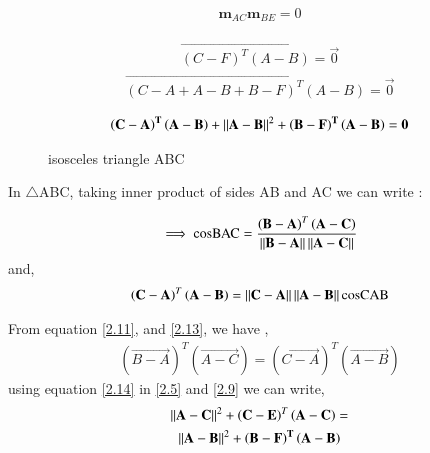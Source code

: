 \documentclass[journal,12pt,twocolumn]{IEEEtran}
\begin{document}
 \begin{align}
 \textbf{m}_{AC} \textbf{m}_{BE} = 0
 \end{align}
 
 \begin{align}
 \vec{\left( C - F\right)^T \left(A - B \right)} =\vec{ 0}
 \end{align}
 \begin{align}
 \vec{\left( C -  A + A - B + B - F\right)^T \left(A - B \right)} = \vec{0}
 \end{align}
 
 \begin{align}
 \mathbf{ \left( C-  A \right)^T \left(A - B \right)} + \left\lVert\mathbf {A - B}\right\rVert^{2} + \mathbf{\left(B - F\right)^T \left(A - B \right)} = \mathbf{0} \label{2.9}
 \end{align}
   
\begin{figure}[!htb]
	\centering
	\resizebox{\columnwidth}{!}{}
	\caption{isosceles triangle ABC}
\end{figure}
  
  
  
  
  

  
   In $\triangle$ABC, taking inner product of sides  AB and AC we can write :
  
 \begin{align}
\implies \text{cosBAC} = \frac{\left( \mathbf{ B - A} \right)^T  \left( \mathbf{A - C } \right)}{\left\lVert\mathbf{ B - A}\right\rVert \left\lVert\mathbf{A - C}\right\rVert} \label{2.11}
\end{align}  
  and,
   \begin{align}
  \left( \mathbf{C - A} \right)^T \left( \mathbf{A - B} \right) = \left\lVert\mathbf{C - A}\right\rVert \left\lVert\mathbf{ A - B}\right\rVert \text{cosCAB} \label{2.13}
  \end{align}
  
  From equation \ref{2.11}, and \ref{2.13}, we have ,
  \begin{multline} 
    \left( \vec{ B - A} \right)^T  \left( \vec{A - C } \right) =  \left( \vec{ C - A} \right)^T  \left( \vec{A - B } \right) \label{2.14}
   \end{multline} 
 using equation \ref{2.14} in \ref{2.5} and \ref{2.9} we can write,
   \begin{multline} 
   \left\lVert\mathbf{A - C}\right\rVert^2 + \left ( \mathbf{ C - E }\right)^T \left( \mathbf{A - C} \right)  =  \\ \left\lVert\mathbf{A - B}\right\rVert^2 + \mathbf{\left (  B - F\right)^{T} \left( A - B \right)}
    \end{multline} 
   
\end{document}
